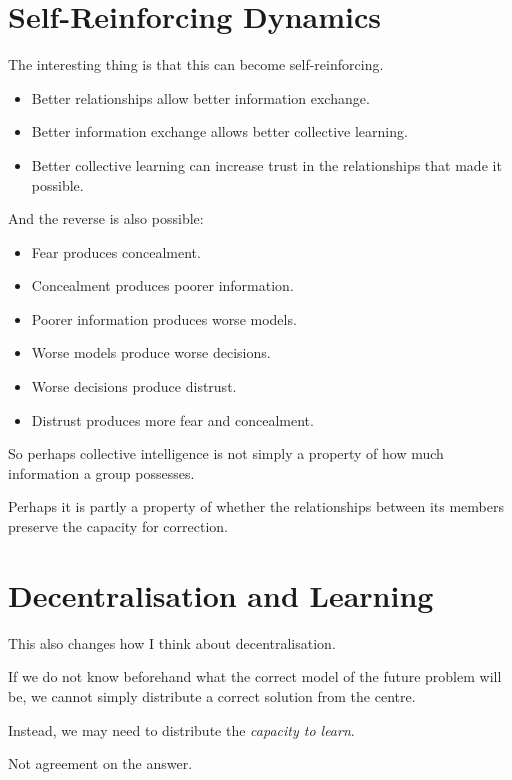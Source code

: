 \documentclass{article}
\begin{document}
\section*{Self-Reinforcing Dynamics}

The interesting thing is that this can become self-reinforcing.

\begin{itemize}
    \item Better relationships allow better information exchange.
    \item Better information exchange allows better collective learning.
    \item Better collective learning can increase trust in the relationships that made it possible.
\end{itemize}

And the reverse is also possible:

\begin{itemize}
    \item Fear produces concealment.
    \item Concealment produces poorer information.
    \item Poorer information produces worse models.
    \item Worse models produce worse decisions.
    \item Worse decisions produce distrust.
    \item Distrust produces more fear and concealment.
\end{itemize}

So perhaps collective intelligence is not simply a property of how much information a group possesses.

Perhaps it is partly a property of whether the relationships between its members preserve the capacity for correction.

\section*{Decentralisation and Learning}

This also changes how I think about decentralisation.

If we do not know beforehand what the correct model of the future problem will be, we cannot simply distribute a correct solution from the centre.

Instead, we may need to distribute the \textit{capacity to learn}.

Not agreement on the answer.
\end{document}
